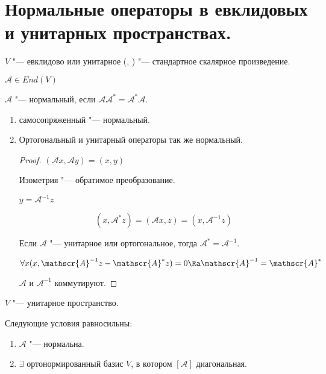 \section{Нормальные операторы в евклидовых и унитарных пространствах.}

\begin{Def}
$V$ "--- евклидово или унитарное (, ) "--- стандартное скалярное произведение.

$\mathscr{A} \in End(V)$ 

$\mathscr{A}$ "--- нормальный, если $\mathscr{A} \mathscr{A}^* = \mathscr{A}^*\mathscr{A}$.
\end{Def}

\begin{exmp}
\begin{enumerate}
    \item  самосопряженный "--- нормальный. 
    \item Ортогональный и унитарный операторы так же нормальный. 

    \begin{proof}
    $(\mathscr{A}x, \mathscr{A}y) = (x, y)$

    Изометрия "--- обратимое преобразование. 

    $y = \mathscr{A}^{-1}z$
    
    $$(x, \mathscr{A}^*z) = (\mathscr{A}x, z) = (x, \mathscr{A}^{-1}z)$$

    Если $\mathscr{A}$ "--- унитарное или ортогональное, тогда $\mathscr{A}^{*} = \mathscr{A}^{-1}$.

    $$\forall x (x, \mathscr{A}^{-1}z - \mathscr{A}^{*}z) = 0 \Ra \mathscr{A}^{-1} = \mathscr{A}^*$$

    $\mathscr{A}$ и $\mathscr{A}^{-1}$ коммутируют. 
    \end{proof}    
\end{enumerate}
\end{exmp}

\begin{theorem}
$V$ "--- унитарное пространство. 

Следующие условия равносильны:
    \begin{enumerate}
    \item $\mathscr{A}$ "--- нормальна. 
    \item $\exists$  ортонормированный базис $V$, в котором $[\mathscr{A}]$ диагональная. 
    \end{enumerate}
\end{theorem}

